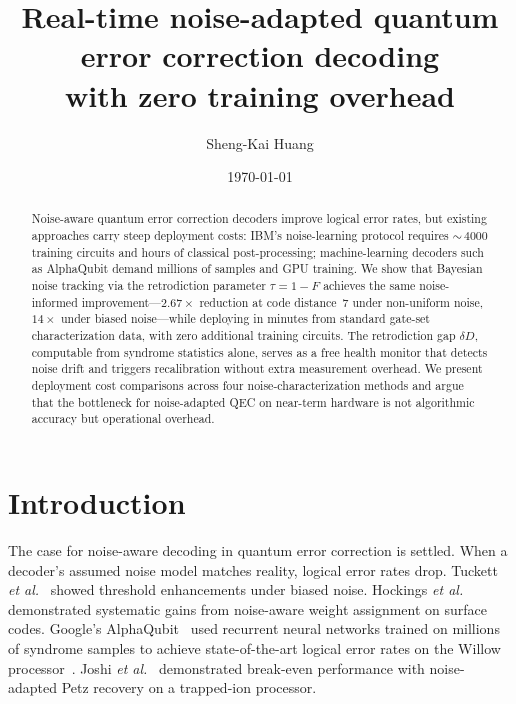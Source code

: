 \documentclass[prl,twocolumn,superscriptaddress,longbibliography]{revtex4-2}
\newcommand{\dd}{\delta\!D}
\begin{document}
\title{Real-time noise-adapted quantum error correction decoding\\with zero training overhead}

\author{Sheng-Kai Huang}

\date{\today}

\begin{abstract}
Noise-aware quantum error correction decoders improve logical error rates, but existing approaches carry steep deployment costs: IBM's noise-learning protocol requires ${\sim}\,4000$ training circuits and hours of classical post-processing; machine-learning decoders such as AlphaQubit demand millions of samples and GPU training. We show that Bayesian noise tracking via the retrodiction parameter $\tau = 1 - F$ achieves the same noise-informed improvement---$2.67\times$ reduction at code distance~7 under non-uniform noise, $14\times$ under biased noise---while deploying in minutes from standard gate-set characterization data, with zero additional training circuits. The retrodiction gap $\dd$, computable from syndrome statistics alone, serves as a free health monitor that detects noise drift and triggers recalibration without extra measurement overhead. We present deployment cost comparisons across four noise-characterization methods and argue that the bottleneck for noise-adapted QEC on near-term hardware is not algorithmic accuracy but operational overhead.
\end{abstract}

\maketitle

\section{Introduction}

The case for noise-aware decoding in quantum error correction is settled. When a decoder's assumed noise model matches reality, logical error rates drop. Tuckett \emph{et al.}~\cite{Tuckett2018} showed threshold enhancements under biased noise. Hockings \emph{et al.}~\cite{Hockings2025} demonstrated systematic gains from noise-aware weight assignment on surface codes. Google's AlphaQubit~\cite{AlphaQubit2024} used recurrent neural networks trained on millions of syndrome samples to achieve state-of-the-art logical error rates on the Willow processor~\cite{GoogleWillow2024}. Joshi \emph{et al.}~\cite{Joshi2026} demonstrated break-even performance with noise-adapted Petz recovery on a trapped-ion processor.
\end{document}
